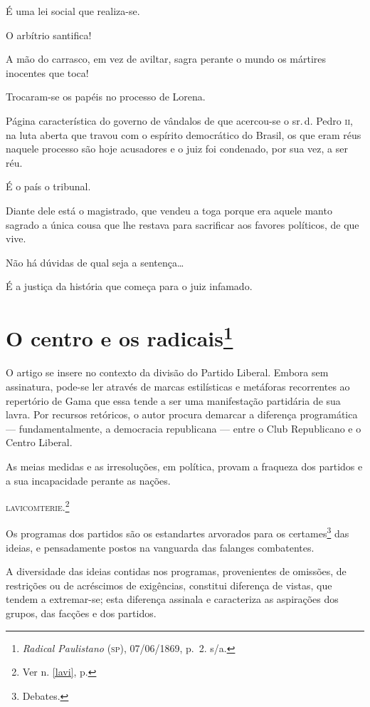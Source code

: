 É uma lei social que realiza-se.

O arbítrio santifica!

A mão do carrasco, em vez de aviltar, sagra perante o mundo os mártires
inocentes que toca!

Trocaram-se os papéis no processo de Lorena.

Página característica do governo de vândalos de que acercou-se o sr.\,d.
Pedro \textsc{ii}, na luta aberta que travou com o espírito democrático do
Brasil, os que eram réus naquele processo são hoje acusadores e o juiz
foi condenado, por sua vez, a ser réu.

É o país o tribunal.

Diante dele está o magistrado, que vendeu a toga porque era aquele manto
sagrado a única cousa que lhe restava para sacrificar aos favores
políticos, de que vive.

Não há dúvidas de qual seja a sentença\ldots{}

É a justiça da história que começa para o juiz infamado.

\chapter{O centro e os radicais\footnote{\emph{Radical Paulistano}
  (\textsc{sp}), 07/06/1869, p.~2. s/a.}}

\begin{didascalia}
O artigo se insere no contexto da divisão do Partido Liberal. Embora sem
assinatura, pode-se ler através de marcas estilísticas e metáforas
recorrentes ao repertório de Gama que essa tende a ser uma manifestação
partidária de sua lavra. Por recursos retóricos, o autor procura
demarcar a diferença programática --- fundamentalmente, a democracia
republicana --- entre o Club Republicano e o Centro Liberal.
\end{didascalia}



As meias medidas e as irresoluções, em política, provam a fraqueza dos
partidos e a sua incapacidade perante as nações.

\textsc{lavicomterie}.\footnote{Ver n. \ref{lavi}, p. \pageref{lavi}}

Os programas dos partidos são os estandartes arvorados para os
certames\footnote{Debates.} das ideias, e pensadamente postos na
vanguarda das falanges combatentes.

A diversidade das ideias contidas nos programas, provenientes de
omissões, de restrições ou de acréscimos de exigências, constitui
diferença de vistas, que tendem a extremar-se; esta diferença assinala e
caracteriza as aspirações dos grupos, das facções e dos partidos.

